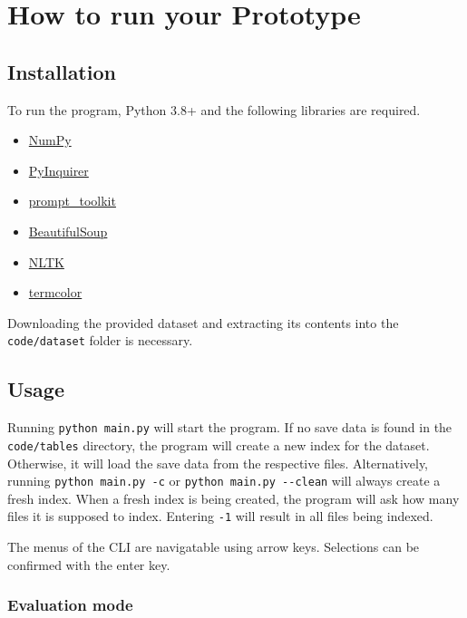 \section{How to run your Prototype}
\label{sec:guide}

\subsection{Installation}

To run the program, Python 3.8+ and the following libraries are required.

\begin{itemize}
  \item \href{https://numpy.org}{NumPy}
  \item \href{https://github.com/CITGuru/PyInquirer}{PyInquirer}
  \item \href{https://github.com/prompt-toolkit/python-prompt-toolkit}{prompt\_toolkit}
  \item \href{https://www.crummy.com/software/BeautifulSoup/bs4/doc/}{BeautifulSoup}
  \item \href{https://www.nltk.org}{NLTK}
  \item \href{https://pypi.org/project/termcolor/}{termcolor}
\end{itemize}

Downloading the provided dataset and extracting its contents into the \verb|code/dataset| folder is necessary.

\subsection{Usage}

Running \verb|python main.py| will start the program.
If no save data is found in the \verb|code/tables| directory, the program will create a new index for the dataset.
Otherwise, it will load the save data from the respective files.
Alternatively, running \verb|python main.py -c| or \verb|python main.py --clean| will always create a fresh index.
When a fresh index is being created, the program will ask how many files it is supposed to index.
Entering \verb|-1| will result in all files being indexed.

The menus of the CLI are navigatable using arrow keys.
Selections can be confirmed with the enter key.


\subsubsection{Evaluation mode}

